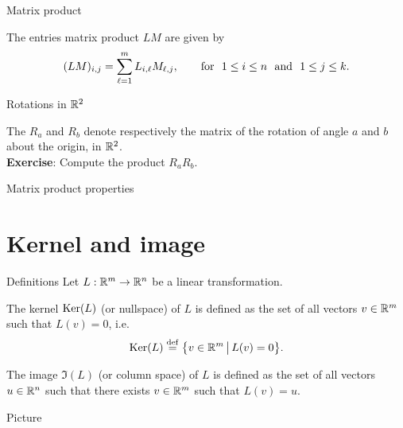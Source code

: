 \documentclass{beamer}
\begin{document}
\begin{frame}[t]{Matrix product}
	\grid
	\vspace{-0.3cm}
	\begin{theorem}
		The entries matrix product $LM$ are given by
		\vspace{-0.2cm}
		$$
		(LM)_{i,j} 
		=\sum_{\ell = 1}^m L_{i,\ell} M_{\ell,j}, \qquad \text{for} \ \  1 \leq i \leq n \ \ \text{and} \ \ 1 \leq j \leq k.
		\vspace{-0.2cm}
		$$
	\end{theorem}
\end{frame}
\begin{frame}[t]{Rotations in $\mathbb{R}^2$}
	\grid

	The $R_{a}$ and $R_{b}$ denote respectively the matrix of the rotation of angle $a$ and $b$ about the origin, in $\mathbb{R}^2$.
	\\
	\vspace{0.3cm}
	\textbf{Exercise}:
	Compute the product $R_a R_b$.

\end{frame}
\begin{frame}[t]{Matrix product properties}
	\grid

\end{frame}

\section{Kernel and image}

\begin{frame}[t]{Definitions}
	Let \quad $L: \mathbb{R}^m \to \mathbb{R}^n$ \quad be a linear transformation.
	\begin{definition}[Kernel]
		The kernel ${{\rm Ker}}(L)$ (or nullspace) of $L$ is defined as the set of all vectors $v \in \mathbb{R}^m$ such that $L(v) = 0$, i.e.
		$$
		{{\rm Ker}}(L) \overset{\rm def}{=} \big\{ v \in \mathbb{R}^m \, \big| \, L(v) = 0 \big\}.
		$$
	\end{definition}

	\begin{definition}[Image]
		The image $\Im(L)$ (or column space) of $L$ is defined as the set of all vectors $u \in \mathbb{R}^n$ such that there exists $v \in \mathbb{R}^m$ such that $L(v) = u$. 
	\end{definition}
\end{frame}



\begin{frame}[t]{Picture}
	\grid
\end{frame}
\end{document}
